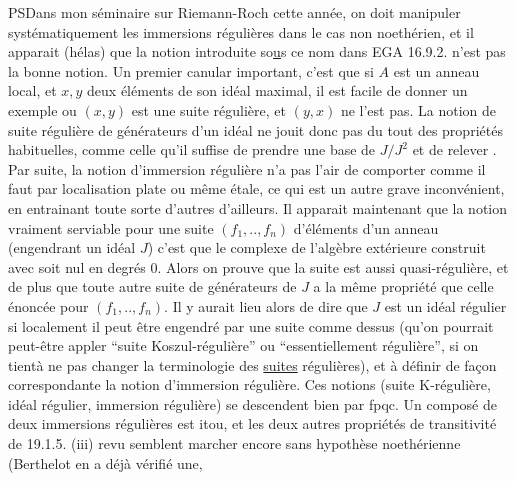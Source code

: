 
PS\quad Dans mon séminaire sur Riemann-Roch cette année, on doit manipuler
systématiquement les immersions régulières dans le cas non noethérien,
et il apparait (hélas) que la notion introduite so\uline{u}s ce nom dans EGA
16.9.2. n'est pas la bonne notion. Un premier canular important, c'est
que si $A$ est un anneau local, et $x,y$ deux éléments de son idéal maximal,
il est facile de donner un exemple ou $(x,y)$ est une suite régulière,
et $(y,x)$ ne l'est pas. La notion de suite régulière de générateurs d'un
idéal ne jouit donc pas du tout des propriétés habituelles, comme
celle qu'il suffise de prendre une base de $J/J^2$ et de relever . Par suite,
la notion d'immersion régulière n'a pas l'air de  comporter
comme il faut par localisation plate ou même étale, ce qui est un autre
grave inconvénient, en entrainant toute sorte d'autres d'ailleurs. Il
apparait maintenant que la notion vraiment serviable pour une suite
$(f_1,..,f_n)$ d'éléments d'un anneau (engendrant un idéal $J$) c'est que
le complexe de l'algèbre extérieure construit avec soit nul en degrés
$0$. Alors on prouve que la suite est aussi quasi-régulière, et de
plus que toute autre suite de  générateurs de $J$ a la même propriété
que celle énoncée pour $(f_1,..,f_n)$. Il y aurait lieu alors de dire que
$J$ est un idéal régulier si localement il peut être engendré par une
suite comme dessus (qu'on pourrait peut-être appler ``suite Koszul-régulière'' ou ``essentiellement régulière'', si on tientà ne pas changer la
terminologie des \uline{suites} régulières), et à définir de façon correspondante
la notion d'immersion régulière. Ces notions (suite K-régulière,
idéal régulier, immersion régulière) se descendent bien par fpqc. Un
composé de deux immersions régulières est itou, et les deux autres
propriétés de transitivité de 19.1.5. (iii) revu semblent marcher
encore sans hypothèse noethérienne (Berthelot en a déjà vérifié une,
